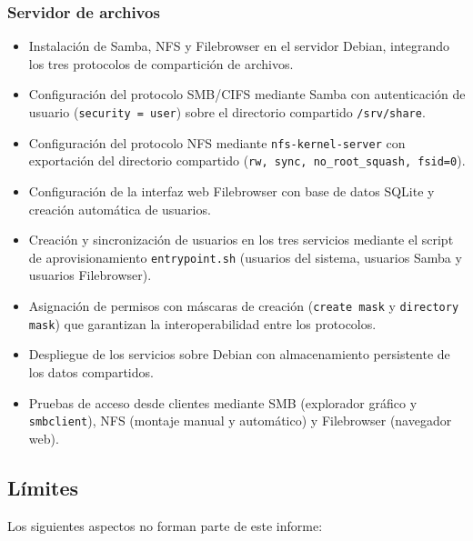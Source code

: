 \subsubsection{Servidor de archivos}
\begin{itemize}
  \item Instalación de Samba, NFS y Filebrowser en el servidor Debian,
        integrando los tres protocolos de compartición de archivos.
  \item Configuración del protocolo SMB/CIFS mediante Samba con
        autenticación de usuario (\texttt{security = user}) sobre el
        directorio compartido \texttt{/srv/share}.
  \item Configuración del protocolo NFS mediante
        \texttt{nfs-kernel-server} con exportación del directorio compartido
        (\texttt{rw, sync, no\_root\_squash, fsid=0}).
  \item Configuración de la interfaz web Filebrowser con base de
        datos SQLite y creación automática de usuarios.
  \item Creación y sincronización de usuarios en los tres servicios mediante
        el script de aprovisionamiento \texttt{entrypoint.sh} (usuarios del
        sistema, usuarios Samba y usuarios Filebrowser).
  \item Asignación de permisos con máscaras de creación (\texttt{create mask}
        y \texttt{directory mask}) que garantizan la interoperabilidad entre
        los protocolos.
  \item Despliegue de los servicios sobre Debian con almacenamiento persistente
        de los datos compartidos.
  \item Pruebas de acceso desde clientes mediante SMB (explorador gráfico y
        \texttt{smbclient}), NFS (montaje manual y automático) y Filebrowser
        (navegador web).
\end{itemize}

\subsection{Límites}

Los siguientes aspectos no forman parte de este informe:

